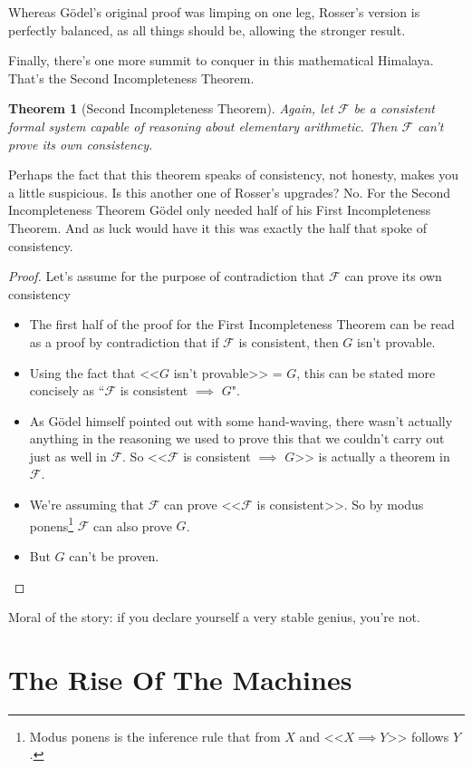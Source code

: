 \documentclass{article}
\theoremstyle{theorem}
\newtheorem{theorem}{Theorem}
\newcommand{\impl}{\item[$\Rightarrow$]}
\begin{document}
Whereas Gödel's original proof was limping on one leg, Rosser's version is perfectly balanced, as all things should be, allowing the stronger result.

Finally, there's one more summit to conquer in this mathematical Himalaya. That's the Second Incompleteness Theorem.

\begin{theorem}[Second Incompleteness Theorem]
Again, let $\mathcal{F}$ be a consistent formal system capable of reasoning about elementary arithmetic. Then $\mathcal{F}$ can't prove its own consistency.
\end{theorem}

Perhaps the fact that this theorem speaks of consistency, not honesty, makes you a little suspicious. Is this another one of Rosser's upgrades? No. For the Second Incompleteness Theorem Gödel only needed half of his First Incompleteness Theorem. And as luck would have it this was exactly the half that spoke of consistency.

\begin{proof}
Let's assume for the purpose of contradiction that $\mathcal{F}$ can prove its own consistency
\begin{itemize}
\impl The first half of the proof for the First Incompleteness Theorem can be read as a proof by contradiction that if $\mathcal{F}$ is consistent, then $G$ isn't provable.
\impl Using the fact that <<$G$ isn't provable>> = $G$, this can be stated more concisely as ``$\mathcal{F}$ is consistent $\implies$ $G$".
\impl As Gödel himself pointed out with some hand-waving, there wasn't actually anything in the reasoning we used to prove this that we couldn't carry out just as well in $\mathcal{F}$. So <<$\mathcal{F}$ is consistent $\implies$ $G$>> is actually a theorem in $\mathcal{F}$.
\impl We're assuming that $\mathcal{F}$ can prove <<$\mathcal{F}$ is consistent>>. So by modus ponens\footnote{Modus ponens is the inference rule that from $X$ and <<$X \implies Y$>> follows $Y$.} $\mathcal{F}$ can also prove $G$.
\impl But $G$ can't be proven. \lightning
\end{itemize}
\end{proof}

Moral of the story: if you declare yourself a very stable genius, you're not.\cite{trump}

\section{The Rise Of The Machines}
\end{document}

